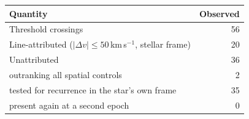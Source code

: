 \begin{tabular}{@{}lr@{}}
\hline
Quantity & Observed \\
\hline
Threshold crossings & 56 \\
Line-attributed ($|\Delta v|\leq50$\,km\,s$^{-1}$, stellar frame) & 20 \\
Unattributed & 36 \\
\quad outranking all spatial controls & 2 \\
\quad tested for recurrence in the star's own frame & 35 \\
\quad present again at a second epoch & 0 \\
\hline
\end{tabular}
